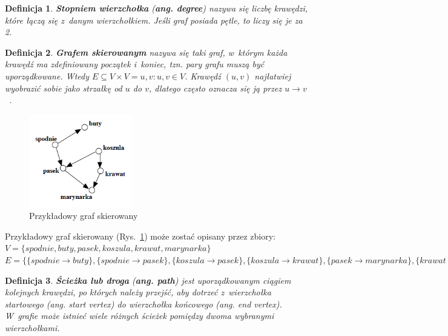 \documentclass[twoside,12pt]{report}
\newtheorem{definition}{Definicja} %
\begin{document}
\begin{definition}
\textbf{Stopniem wierzchołka} (\textbf{ang. degree}) nazywa się liczbę krawędzi, które łączą się z~danym wierzchołkiem. Jeśli graf posiada pętle, to liczy się je za 2.
\end{definition}

\begin{definition}\label{def:graf_skierowany}
\textbf{Grafem skierowanym} nazywa się taki graf, w~którym każda krawędź ma zdefiniowany początek i~koniec, tzn. pary grafu muszą być uporządkowane. Wtedy $E \subseteq V \times V = {{u,v}:u,v \in V}$.
Krawędź $(u,v)$ najłatwiej wyobrazić sobie jako strzałkę od $u$ do $v$, dlatego często oznacza się ją przez $u \rightarrow v$~\cite{grafy}.
\end{definition}

\begin{figure}[htbp]
\centering
\includegraphics[width=0.40\textwidth]{img/graf2}
\caption{Przykładowy graf skierowany} 
\label{fig:graf_skierowany} 
\end{figure}

Przykładowy graf skierowany (Rys.~\ref{fig:graf_skierowany}) może zostać opisany przez zbiory:
\newline
\begin{math}
V=\{spodnie, buty, pasek, koszula, krawat, marynarka\}
\end{math}
\newline
\begin{math}
E=\{\{spodnie \rightarrow buty\},\{spodnie  \rightarrow pasek\},
	\{koszula \rightarrow pasek\},\{koszula \rightarrow krawat\},
	\{pasek \rightarrow marynarka\},\{krawat \rightarrow marynarka\}\}
\end{math}

\begin{definition}
\textbf{Ścieżka lub droga} (\textbf{ang. path}) jest uporządkowanym ciągiem kolejnych krawędzi, po których należy przejść, aby dotrzeć z~wierzchołka startowego (\textit{ang. start vertex}) do wierzchołka końcowego (\textit{ang. end vertex}). W~grafie może istnieć wiele różnych ścieżek pomiędzy dwoma wybranymi wierzchołkami.
\end{definition}
\end{document}
